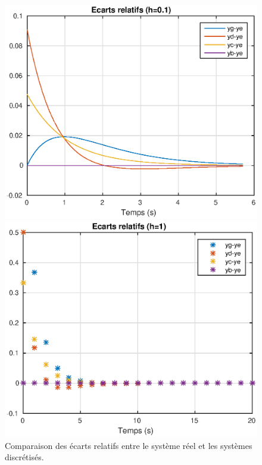 \begin{figure}[h]
	\begin{minipage}[b]{.5\linewidth}
	\centering
	\includegraphics[scale=.6]{eps/labo1-ecarts-0-1}
	\end{minipage}
	\begin{minipage}[b]{.5\linewidth}
	\centering
	\includegraphics[scale=.6]{eps/labo1-ecarts-1}
	\end{minipage}
	\caption{Comparaison des écarts relatifs entre le système réel et les systèmes discrétisés.}
\label{labo1-ecarts}
\end{figure}


